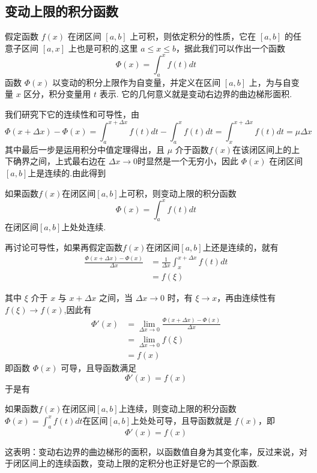 \subsection{变动上限的积分函数}
\label{sec:variable-upper-limit-integral-function}

假定函数 $f(x)$ 在闭区间 $[a,b]$ 上可积，则依定积分的性质，它在 $[a,b]$ 的任意子区间 $[a,x]$ 上也是可积的,这里 $a \leqslant x \leqslant b$，据此我们可以作出一个函数
\[ \Phi(x) = \int_a^x f(t) dt \]
函数 $\Phi(x)$ 以变动的积分上限作为自变量，并定义在区间 $[a,b]$ 上，为与自变量 $x$ 区分，积分变量用 $t$ 表示. 它的几何意义就是变动右边界的曲边梯形面积.

我们研究下它的连续性和可导性，由
\[ \Phi(x+\Delta x) - \Phi(x) = \int_a^{x+\Delta x} f(t)dt - \int_a^x f(t)dt = \int_x^{x+\Delta x} f(t)dt = \mu \Delta x \]
其中最后一步是运用积分中值定理得出，且 $\mu$ 介于函数$f(x)$在该闭区间上的上下确界之间，上式最右边在 $\Delta x \rightarrow 0$时显然是一个无穷小，因此 $\Phi(x)$ 在闭区间 $[a,b]$上是连续的.由此得到
\begin{theorem}
  如果函数$f(x)$在闭区间$[a,b]$上可积，则变动上限的积分函数
  \[ \Phi(x) = \int_a^x f(t)dt \]
  在闭区间$[a,b]$上处处连续.
\end{theorem}

再讨论可导性，如果再假定函数$f(x)$在闭区间$[a,b]$上还是连续的，就有
\begin{equation*}
  \begin{split}
    \frac{\Phi(x+\Delta x)-\Phi(x)}{\Delta x} & = \frac{1}{\Delta x}\int_x^{x+\Delta x} f(t) dt \\
    & = f(\xi)
  \end{split}
\end{equation*}

其中 $\xi$ 介于 $x$ 与 $x+\Delta x$ 之间，当 $\Delta x \rightarrow 0$ 时，有 $\xi \rightarrow x$，再由连续性有 $f(\xi) \rightarrow f(x)$,因此有
\begin{equation*}
  \begin{split}
    \Phi'(x) & = \lim_{\Delta x \rightarrow 0}   \frac{\Phi(x+\Delta x)-\Phi(x)}{\Delta x} \\
    & = \lim_{\Delta x \rightarrow 0} f(\xi) \\
    & = f(x)
  \end{split}
\end{equation*}
即函数 $\Phi(x)$ 可导，且导函数满足
\[ \Phi'(x) = f(x) \]
于是有
\begin{theorem}
  如果函数$f(x)$在闭区间$[a,b]$上连续，则变动上限的积分函数$\Phi(x)=\int_a^xf(t)dt$在区间$[a,b]$上处处可导，且导函数就是 $f(x)$，即
  \[ \Phi'(x) = f(x) \]
\end{theorem}
这表明：变动右边界的曲边梯形的面积，以函数值自身为其变化率，反过来说，对于闭区间上的连续函数，变动上限的定积分也正好是它的一个原函数.

